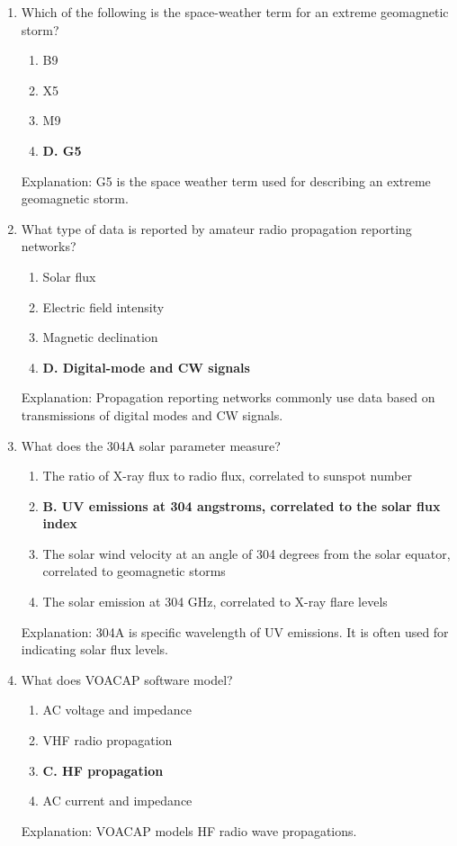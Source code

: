 \begin{enumerate}
     \item Which of the following is the space-weather term for an extreme geomagnetic storm?
       \begin{enumerate}
         \item  B9
         \item  X5
       \item  M9
     \item \textbf{D. G5}
        \end{enumerate}
       \textcolor{myred}{Explanation:}
        G5 is the space weather term used for describing an extreme geomagnetic storm.
        
     \item What type of data is reported by amateur radio propagation reporting networks?
       \begin{enumerate}
       \item  Solar flux
      \item  Electric field intensity
         \item  Magnetic declination
     \item \textbf{D. Digital-mode and CW signals}
        \end{enumerate}
       \textcolor{myred}{Explanation:}
       Propagation reporting networks commonly use data based on transmissions of digital modes and CW signals.
       
       \item What does the 304A solar parameter measure?
    \begin{enumerate}
        \item  The ratio of X-ray flux to radio flux, correlated to sunspot number
        \item \textbf{B. UV emissions at 304 angstroms, correlated to the solar flux index}
    \item  The solar wind velocity at an angle of 304 degrees from the solar equator, correlated to geomagnetic storms
   \item  The solar emission at 304 GHz, correlated to X-ray flare levels
        \end{enumerate}
        \textcolor{myred}{Explanation:}
          304A is specific wavelength of UV emissions. It is often used for indicating solar flux levels.
          
     \item What does VOACAP software model?
         \begin{enumerate}
       \item  AC voltage and impedance
       \item  VHF radio propagation
        \item \textbf{C. HF propagation}
         \item  AC current and impedance
     \end{enumerate}
     \textcolor{myred}{Explanation:}
        VOACAP models HF radio wave propagations.
       

\end{enumerate}
